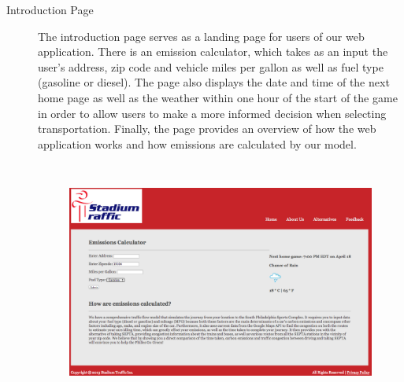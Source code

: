 \begin{description}
    \item[Introduction Page] The introduction page serves as a landing
  page for users of our web application. There is an emission
  calculator, which takes as an input the user's address, zip code and
  vehicle miles per gallon as well as fuel type (gasoline or
  diesel). The page also displays the date and time of the next home
  page as well as the weather within one hour of the start of the game
  in order to allow users to make a more informed decision when
  selecting transportation. Finally, the page provides an overview of
  how the web application works and how emissions are calculated by
  our model.
  \begin{figure}[htp]
    \centering
    \includegraphics[height=8cm]{graphics/website/intro.png}
    \caption{}
  \end{figure}


\end{description}
